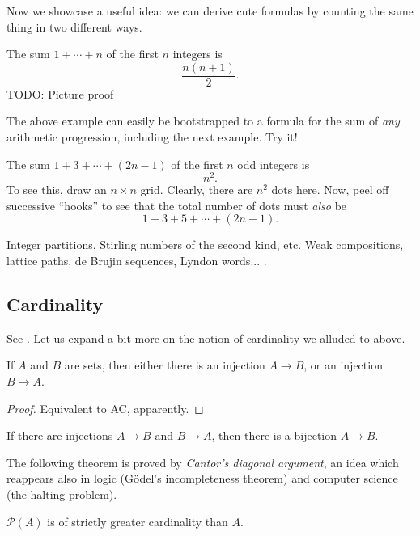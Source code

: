 Now we showcase a useful idea: we can derive cute formulas by counting the same thing in two different ways.

\begin{example}
The sum $1+\cdots+n$ of the first $n$ integers is
\[ \frac{n(n+1)}{2}. \]
TODO: Picture proof
\end{example}

The above example can easily be bootstrapped to a formula for the sum of \emph{any} arithmetic progression, including the next example. Try it!

\begin{example}
The sum $1+3+\cdots+(2n-1)$ of the first $n$ odd integers is
\[ n^2. \]
To see this, draw an $n \times n$ grid. Clearly, there are $n^2$ dots here. Now, peel off successive ``hooks'' to see that the total number of dots must \emph{also} be
\[ 1 + 3 + 5 + \cdots + (2n-1). \]
\end{example}

\begin{example}
Integer partitions, Stirling numbers of the second kind, etc.  Weak compositions, lattice paths, de Brujin sequences, Lyndon words... \cite{Sta1}.
\end{example}

\subsection{Cardinality}

See \cite{PM442}. Let us expand a bit more on the notion of cardinality we alluded to above.

\begin{lemma}
If $A$ and $B$ are sets, then either there is an injection $A \to B$, or an injection $B \to A$.
\end{lemma}

\begin{proof}
Equivalent to AC, apparently.
\end{proof}

\begin{theorem}
If there are injections $A \to B$ and $B \to A$, then there is a bijection $A \to B$.
\end{theorem}

The following theorem is proved by \emph{Cantor's diagonal argument}, an idea which reappears also in logic (G\"odel's incompleteness theorem) and computer science (the halting problem).

\begin{theorem}
$\mathcal{P}(A)$ is of strictly greater cardinality than $A$.
\end{theorem}

